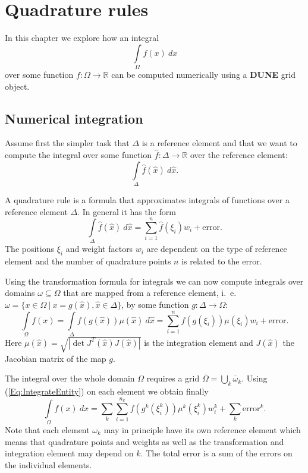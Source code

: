 \documentclass[11pt,a4paper,headinclude,footinclude,DIV16,normalheadings]{scrreprt}
\newcommand{\Dune}{{\sf\bfseries DUNE}\xspace}
\begin{document}


\chapter{Quadrature rules}
\label{sec:quadrature}

In this chapter we explore how an integral $$\int\limits_{\Omega} f(x)\ dx$$
over some function $f:\Omega\to\mathbb{R}$ can be computed numerically
using a \Dune{} grid object.

\section{Numerical integration}

Assume first the simpler task that $\Delta$ is a reference element 
and that we want to
compute the integral over some function $\hat{f}:\Delta\to\mathbb{R}$
over the reference element:$$\int\limits_{\Delta} \hat{f}(\hat{x})\ d\hat{x}.$$


A quadrature rule is a formula that approximates integrals of
functions over a reference element $\Delta$. In general it has the form
$$\int\limits_{\Delta} \hat{f}(\hat{x})\ d\hat{x} = \sum_{i=1}^n
\hat{f}(\xi_i) w_i + \text{error}.$$
The positions $\xi_i$ and weight factors $w_i$ are dependent on the
type of reference element and the number of quadrature points $n$ is
related to the error.

Using the transformation formula for integrals we can now compute
integrals over domains $\omega\subseteq\Omega$ that are mapped from a
reference element, i.~e.~$\omega=\{x\in\Omega\ |\
x=g(\hat{x}), \hat{x}\in\Delta\}$, by some function $g:\Delta\to\Omega$:
\begin{equation}
\int\limits_{\Omega} f(x) = \int\limits_{\Delta} f(g(\hat{x}))\mu(\hat{x})\
d\hat{x} = \sum_{i=1}^n f(g(\xi_i))\mu(\xi_i)w_i + \text{error}. 
\label{Eq:IntegrateEntity}
\end{equation}
Here $\mu(\hat{x}) = \sqrt{|\det J^T(\hat{x})J(\hat{x})|}$ is the
integration element and $J(\hat{x})$ the Jacobian matrix of the map $g$.

The integral over the whole domain $\Omega$ requires a grid
$\overline{\Omega}=\bigcup_k \overline{\omega}_k$. Using
(\ref{Eq:IntegrateEntity}) on each element we obtain finally
\begin{equation}
\int\limits_{\Omega} f(x)\ dx = \sum\limits_{k} \sum_{i=1}^{n_k}
f(g^k(\xi^k_i))\mu^k(\xi^k_i)w^k_i + \sum\limits_{k} \text{error}^k.
\label{Eq:IntegrateDomain}
\end{equation}
Note that each element $\omega_k$ may in principle have its own
reference element which means that quadrature points and weights as
well as the transformation and integration element may depend on
$k$. The total error is a sum of the errors on the individual
elements. 
\end{document}
